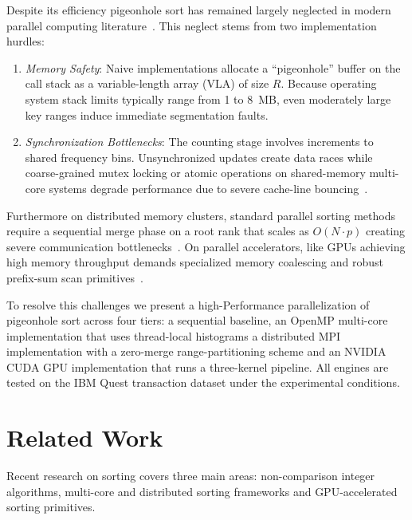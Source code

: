 \documentclass[conference]{IEEEtran}
\begin{document}
Despite its efficiency pigeonhole sort has remained largely neglected in modern parallel computing literature~\cite{yu2022}. This neglect stems from two implementation hurdles:
\begin{enumerate}
\item \textit{Memory Safety}: Naive implementations allocate a ``pigeonhole'' buffer on the call stack as a variable-length array (VLA) of size $R$. Because operating system stack limits typically range from 1 to 8~MB, even moderately large key ranges induce immediate segmentation faults.
\item \textit{Synchronization Bottlenecks}: The counting stage involves increments to shared frequency bins. Unsynchronized updates create data races while coarse-grained mutex locking or atomic operations on shared-memory multi-core systems degrade performance due to severe cache-line bouncing~\cite{ketchaya2023}.
\end{enumerate}

Furthermore on distributed memory clusters, standard parallel sorting methods require a sequential merge phase on a root rank that scales as $O(N \cdot p)$ creating severe communication bottlenecks~\cite{li2022,salimibeni2024}. On parallel accelerators, like GPUs achieving high memory throughput demands specialized memory coalescing and robust prefix-sum scan primitives~\cite{adinets2022,safari2022}.

To resolve this challenges we present a high-Performance parallelization of pigeonhole sort across four tiers: a sequential baseline, an OpenMP multi-core implementation that uses thread-local histograms a distributed MPI implementation with a zero-merge range-partitioning scheme and an NVIDIA CUDA GPU implementation that runs a three-kernel pipeline. All engines are tested on the IBM Quest transaction dataset under the experimental conditions.

\section{Related Work}
Recent research on sorting covers three main areas: non-comparison integer algorithms, multi-core and distributed sorting frameworks and GPU-accelerated sorting primitives.
\end{document}

